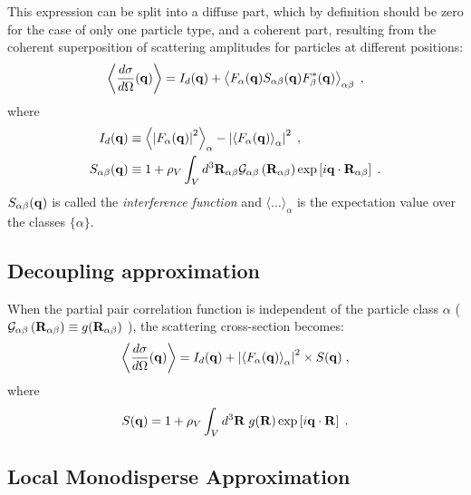 This expression can be split into a diffuse part, which by definition should be zero for the case of only one particle type, and a coherent part, resulting from the coherent superposition of scattering amplitudes for particles at different positions:
\begin{equation*}
  \left\langle \frac{d\sigma}{d\Omega}(\mathbf{q}) \right\rangle = I_d(\mathbf{q}) + \left\langle F_\alpha (\mathbf{q} ) S_{\alpha\beta} (\mathbf{q}) F_\beta^* (\mathbf{q}) \right\rangle_{\alpha\beta}  \; ,
\end{equation*}
where
\begin{align*}
  I_d(\mathbf{q}) &\equiv \left\langle \left\rvert F_\alpha (\mathbf{q}) \right\rvert^2 \right\rangle_{\alpha}  - \left\lvert \left\langle  F_\alpha (\mathbf{q}) \right\rangle_{\alpha}  \right\rvert^2 \; , \\
  S_{\alpha\beta} (\mathbf{q}) &\equiv 1 + \rho_V \int_V d^3\mathbf{R}_{\alpha\beta}\mathcal{G}_{\alpha \beta}\left( \mathbf{R}_{\alpha \beta} \right) \exp \left[ i\mathbf{q}\cdot \mathbf{R}_{\alpha\beta} \right] \; .
\end{align*}
$S_{\alpha\beta} (\mathbf{q})$ is called the \emph{interference function} and $\langle\dotso\rangle_\alpha$ is the expectation value over the classes $\lbrace \alpha\rbrace$.


\subsection{Decoupling approximation}

When the partial pair correlation function is independent of the particle class $\alpha$ ($ \mathcal{G}_{\alpha \beta}\left( \mathbf{R}_{\alpha \beta} \right) \equiv g(\mathbf{R}_{\alpha\beta})$ ), the scattering cross-section becomes:
\begin{equation*}
\left\langle \frac{d\sigma}{d\Omega}(\mathbf{q}) \right\rangle  = I_d(\mathbf{q}) + \left\lvert \left\langle F_\alpha(\mathbf{q}) \right\rangle_\alpha \right\rvert ^2 \times S(\mathbf{q}) \; ,
\end{equation*}
where
\begin{equation*} 
  S(\mathbf{q}) = 1+ \rho_V \int_V d^3\mathbf{R} \; g(\mathbf{R}) \exp \left[ i\mathbf{q}\cdot \mathbf{R} \right] \; .
\end{equation*}


\subsection{Local Monodisperse Approximation}
  
